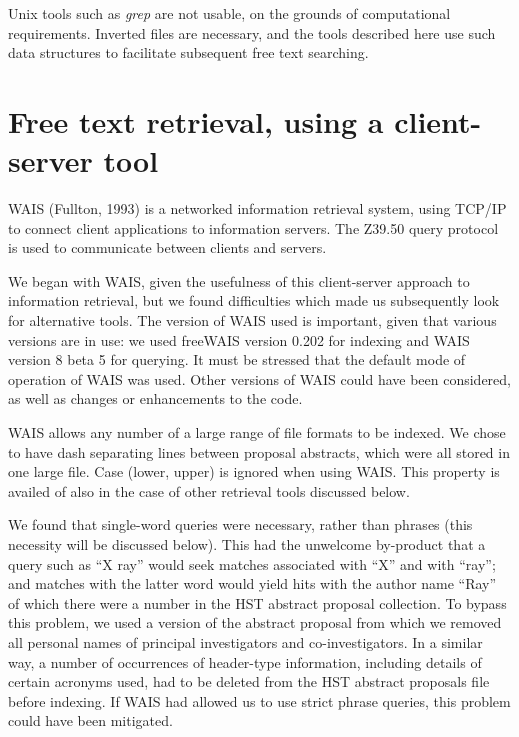 Unix tools such as {\it grep} are not usable, on the grounds of computational
requirements.  Inverted files are necessary, and the tools described here 
use such data structures to facilitate subsequent free text searching.


\section{Free text retrieval, using a client-server tool}

WAIS (Fullton, 1993) 
is a networked information retrieval system, using TCP/IP
to connect client applications to information servers.  The Z39.50 query 
protocol is used to communicate between clients and servers.

We began with WAIS, given the usefulness of this client-server approach to 
information retrieval, but we found difficulties which made us subsequently
look for alternative tools.  The version of WAIS used is important, given that
various versions are in use: we used freeWAIS version 0.202 for indexing
and WAIS version 8 beta 5 for querying.  It must be
stressed that the default mode of operation of WAIS was used.  
Other versions of WAIS could have been considered, as well as changes 
or enhancements to the code.

WAIS allows any number of a large range of file formats to be indexed.  We
chose to have dash separating lines between proposal abstracts, which were
all stored in one large file.  Case (lower, upper) is ignored when using
WAIS. This property is availed of also in the case of other retrieval tools 
discussed below.

We found that single-word queries were
necessary, rather than phrases (this necessity will be discussed below).  
This had the unwelcome by-product that a query such as ``X ray'' would 
seek matches associated with ``X'' and with ``ray''; and matches with the 
latter word would yield hits with the author name ``Ray'' of which there
were a number in the HST abstract proposal collection.  To bypass this
problem, we used
a version of the abstract proposal from which we removed all personal names
of principal investigators and co-investigators. 
In a similar way, a number of occurrences of header-type information,
including details of certain acronyms used, had to be deleted from the 
HST abstract proposals file before indexing.  If WAIS had allowed us to 
use strict phrase queries, this problem could have been mitigated.

